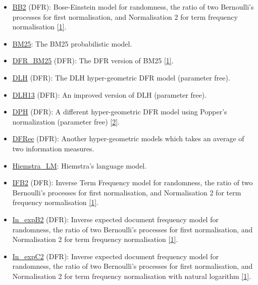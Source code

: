 \begin{itemize}
\tightlist
\item
  \href{javadoc/org/terrier/matching/models/BB2.html}{BB2} (DFR):
  Bose-Einstein model for randomness, the ratio of two Bernoulli's
  processes for first normalisation, and Normalisation 2 for term
  frequency normalisation \protect\hyperlink{cite1}{{[}1{]}}.
\item
  \href{javadoc/org/terrier/matching/models/BM25.html}{BM25}: The BM25
  probabilistic model.
\item
  \href{javadoc/org/terrier/matching/models/DFR_BM25.html}{DFR\_BM25}
  (DFR): The DFR version of BM25 \protect\hyperlink{cite1}{{[}1{]}}.
\item
  \href{javadoc/org/terrier/matching/models/DLH.html}{DLH} (DFR): The
  DLH hyper-geometric DFR model (parameter free).
\item
  \href{javadoc/org/terrier/matching/models/DLH13.html}{DLH13} (DFR): An
  improved version of DLH (parameter free).
\item
  \href{javadoc/org/terrier/matching/models/DPH.html}{DPH} (DFR): A
  different hyper-geometric DFR model using Popper's normalization
  (parameter free) \protect\hyperlink{cite2}{{[}2{]}}.
\item
  \href{javadoc/org/terrier/matching/models/DFRee.html}{DFRee} (DFR):
  Another hyper-geometric models which takes an average of two
  information measures.
\item
  \href{javadoc/org/terrier/matching/models/Hiemstra_LM.html}{Hiemstra\_LM}:
  Hiemstra's language model.
\item
  \href{javadoc/org/terrier/matching/models/IFB2.html}{IFB2} (DFR):
  Inverse Term Frequency model for randomness, the ratio of two
  Bernoulli's processes for first normalisation, and Normalisation 2 for
  term frequency normalisation \protect\hyperlink{cite1}{{[}1{]}}.
\item
  \href{javadoc/org/terrier/matching/models/In_expB2.html}{In\_expB2}
  (DFR): Inverse expected document frequency model for randomness, the
  ratio of two Bernoulli's processes for first normalisation, and
  Normalisation 2 for term frequency normalisation
  \protect\hyperlink{cite1}{{[}1{]}}.
\item
  \href{javadoc/org/terrier/matching/models/In_expC2.html}{In\_expC2}
  (DFR): Inverse expected document frequency model for randomness, the
  ratio of two Bernoulli's processes for first normalisation, and
  Normalisation 2 for term frequency normalisation with natural
  logarithm \protect\hyperlink{cite1}{{[}1{]}}.

\end{itemize}
